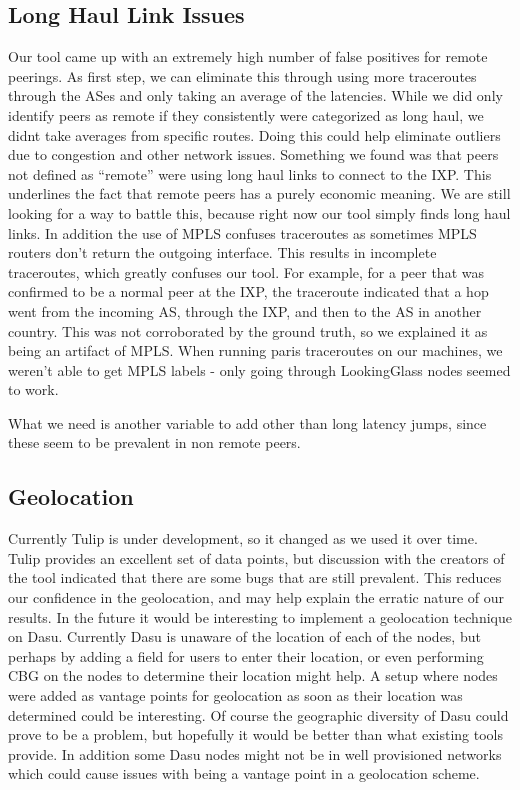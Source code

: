 \documentclass{acm_proc_article-sp}
\begin{document}
\subsection{Long Haul Link Issues}
Our tool came up with an extremely high number of false positives for remote peerings. As first step, we can eliminate this
through using more traceroutes through the ASes and only taking an average of the latencies. While we did only identify peers as 
remote if they consistently were categorized as long haul, we didnt take averages from specific routes. Doing this could help eliminate 
outliers due to congestion and other network issues. Something we found was that peers not defined as ``remote'' were using long haul links
to connect to the IXP. This underlines the fact that remote peers has a purely economic meaning. We are still looking for a way to battle this,
because right now our tool simply finds long haul links. In addition the use of MPLS confuses traceroutes as sometimes MPLS routers don't 
return the outgoing interface. This results in incomplete traceroutes, which greatly confuses our tool. For example, for a peer that was confirmed to be 
a normal peer at the IXP, the traceroute indicated that a hop went from the incoming AS, through the IXP, and then to the AS in another country. This was not corroborated by the ground truth, so we explained it as being
an artifact of MPLS. When running paris traceroutes on our machines, we weren't able to get
MPLS labels - only going through LookingGlass nodes seemed to work. 

What we need is another variable to add other than long latency jumps, since these seem to be prevalent in non remote peers.
\subsection{Geolocation}
Currently Tulip is under development, so it changed as we used it over time. Tulip provides an excellent set of data points, but discussion with the creators of the tool indicated that there are some bugs that 
are still prevalent. This reduces our confidence in the geolocation, and may help explain the erratic nature of our results. In the future it would be interesting to implement a geolocation 
technique on Dasu. Currently Dasu is unaware of the location of each of the nodes, but perhaps by adding a field for users to enter their location, or even performing CBG on the nodes to determine their location might help.
A setup where nodes were added as vantage points for geolocation as soon as their location was determined could be interesting. Of course the geographic diversity of Dasu could prove to be a problem, but hopefully it would
be better than what existing tools provide. In addition some Dasu nodes might not be in well provisioned networks which could cause issues with being a vantage point in a geolocation scheme. 
\end{document}
